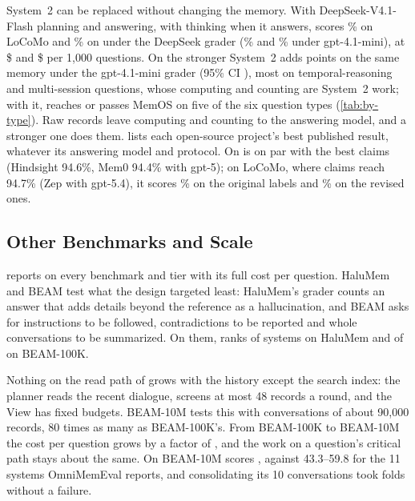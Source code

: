 System~2 can be replaced without changing the memory.
With DeepSeek-V4.1-Flash planning and answering, with thinking when it answers, \sys{} scores \dsFinLoCoMo\% on LoCoMo and \dsFinLME\% on \lme{} under the DeepSeek grader (\dsFinLoCoMoMini\% and \dsFinLMEMini\% under gpt-4.1-mini), at \$\dsCostLoCoMo{} and \$\dsCostLME{} per 1,000 questions.
On \lme{} the stronger System~2 adds \readerGainLME{} points on the same memory under the gpt-4.1-mini grader (95\% CI \readerGainLMECI), most on temporal-reasoning and multi-session questions, whose computing and counting are System~2 work; with it, \sys{} reaches or passes MemOS on five of the six \lme{} question types (\cref{tab:by-type}). Raw records leave computing and counting to the answering model, and a stronger one does them.
 lists each open-source project's best published result, whatever its answering model and protocol.
On \lme{} \sys{} is on par with the best claims (Hindsight 94.6\%, Mem0 94.4\% with gpt-5); on LoCoMo, where claims reach 94.7\% (Zep with gpt-5.4), it scores \dsFinLoCoMo\% on the original labels and \dsFinLoCoMoRev\% on the revised ones.



\subsection{Other Benchmarks and Scale}
\label{sec:scale}

 reports \sys{} on every benchmark and tier with its full cost per question.
HaluMem and BEAM test what the design targeted least: HaluMem's grader counts an answer that adds details beyond the reference as a hallucination, and BEAM asks for instructions to be followed, contradictions to be reported and whole conversations to be summarized.
On them, \sys{} ranks \finHaluRankWord{} of \haluSystems{} systems on HaluMem and \finBeamRankWord{} of \beamSystems{} on BEAM-100K.



Nothing on the read path of \sys{} grows with the history except the search index: the planner reads the recent dialogue, \jev{} screens at most 48 records a round, and the View has fixed budgets.
BEAM-10M tests this with conversations of about 90,000 records, 80 times as many as BEAM-100K's.
From BEAM-100K to BEAM-10M the cost per question grows by a factor of \beamTenCostRatioC{}, and the work on a question's critical path stays about the same.
On BEAM-10M \sys{} scores \beamTenC, against 43.3--59.8 for the 11 systems OmniMemEval reports, and consolidating its 10 conversations took \beamTenBatches{} folds without a failure.

